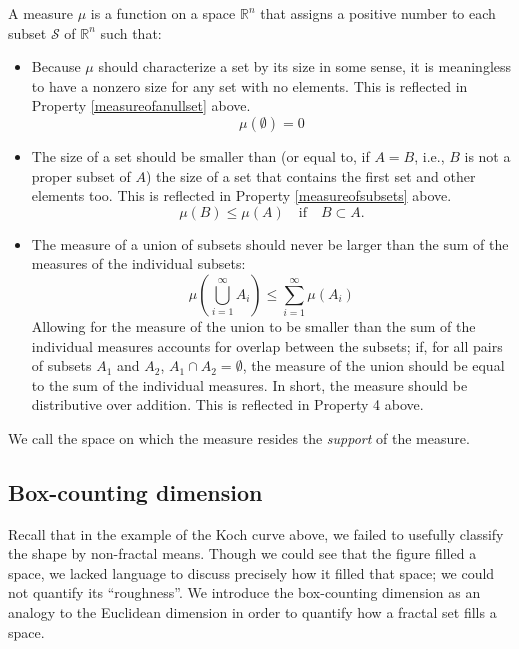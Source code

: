 \begin{mydef}
A measure $ \mu $ is a function on a space $ \mathbb{R}^{n} $ that assigns a positive number to each subset $ \mathcal{S} $ of $ \mathbb{R}^{n} $ such that:

\begin{itemize}
\item Because $\mu$ should characterize a set by its size in some sense, it is meaningless to have a nonzero size for any set with no elements. This is reflected in Property \ref{measureofanullset} above.
\begin{equation}
\mu(\emptyset) = 0
\end{equation}
\item The size of a set should be smaller than (or equal to, if $ A = B $, i.e., $B$ is not a proper subset of $A$) the size of a set that contains the first set and other elements too. This is reflected in Property \ref{measureofsubsets} above.
\begin{equation}
\mu(B) \le \mu(A) \mathrm{ \quad if \quad }  B \subset A.
\end{equation} 
\item The measure of a union of subsets should never be larger than the sum of the measures of the individual subsets: 
\begin{equation}
\mu\left(\bigcup_{i=1}^{\infty} A_i\right) \le \sum_{i=1}^{\infty} \mu(A_i) 
\end{equation}
Allowing for the measure of the union to be smaller than the sum of the individual measures accounts for overlap between the subsets; if, for all pairs of subsets $A_1$ and $A_2$, $A_1 \cap A_2 = \emptyset$, the measure of the union should be equal to the sum of the individual measures. In short, the measure should be distributive over addition. This is reflected in Property 4 above.
\end{itemize}

We call the space on which the measure resides the \textit{support} of the measure.
\end{mydef}

\subsection{Box-counting dimension}
Recall that in the example of the Koch curve above, we failed to usefully classify the shape by non-fractal means. Though we could see that the figure filled a space, we lacked language to discuss precisely how it filled that space; we could not quantify its ``roughness''. We introduce the box-counting dimension as an analogy to the Euclidean dimension in order to quantify how a fractal set fills a space.

